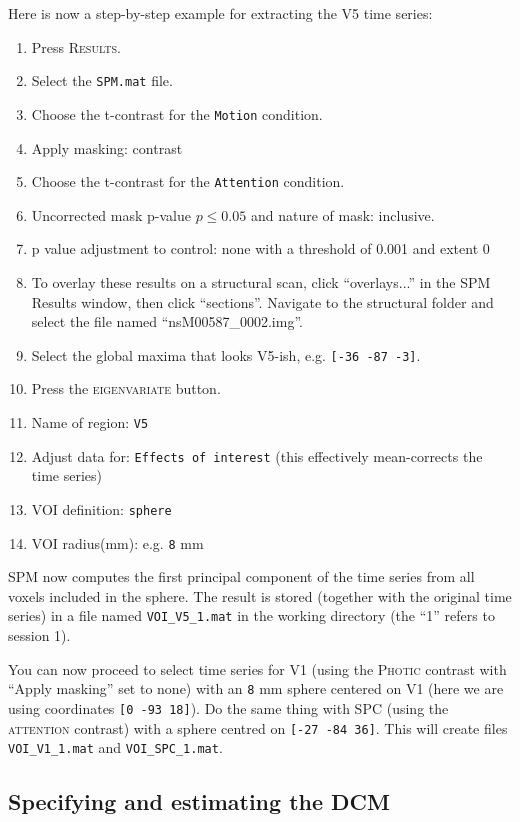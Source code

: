 Here is now a step-by-step example for extracting the V5 time series:
\begin{enumerate}
 \item Press \textsc{Results}.
 \item Select the \texttt{SPM.mat} file.
 \item Choose the t-contrast for the \texttt{Motion} condition.
 \item Apply masking: contrast
 \item Choose the t-contrast for the \texttt{Attention} condition.
 \item Uncorrected mask p-value $p \leq 0.05$ and nature of mask: inclusive.
 \item p value adjustment to control: none with a threshold of 0.001 and extent 0
 \item To overlay these results on a structural scan, click ``overlays...'' in the SPM Results window, then click ``sections''. Navigate to the structural folder and select the file named ``nsM00587\_0002.img''.
 \item Select the global maxima that looks V5-ish, e.g. \texttt{[-36 -87 -3]}.
 \item Press the \textsc{eigenvariate} button.
 \item Name of region: \texttt{V5}
 \item Adjust data for: \texttt{Effects of interest} (this effectively mean-corrects the time series)
 \item VOI definition: \texttt{sphere}
 \item VOI radius(mm): e.g. \texttt{8} mm
\end{enumerate}
SPM now computes the first principal component of the time series from all voxels included in the sphere. The result is stored (together with the original time series) in a file named \texttt{VOI\_V5\_1.mat} in the working directory (the ``1'' refers to session 1).

You can now proceed to select time series for V1 (using the \textsc{Photic} contrast with ``Apply masking'' set to none) with an \texttt{8} mm sphere centered on V1 (here we are using coordinates \texttt{[0 -93 18]}). Do the same thing with SPC (using the \textsc{attention} contrast) with a sphere centred on \texttt{[-27 -84 36]}. This will create files \texttt{VOI\_V1\_1.mat} and \texttt{VOI\_SPC\_1.mat}.

\subsection{Specifying and estimating the DCM}

